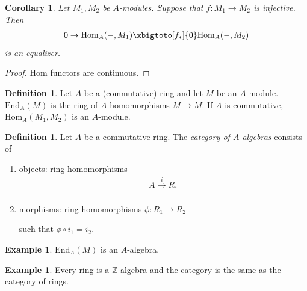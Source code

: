 \documentclass[12pt]{report}
\theoremstyle{plain}
\newtheorem{corollary}[theorem]{Corollary}
\theoremstyle{remark}
\theoremstyle{definition}
\newtheorem{definition}[theorem]{Definition}
\newtheorem{example}[theorem]{Example}
\newcommand{\Z}{\mathbb{Z}}
\newcommand{\Hom}[3]{\mathrm{Hom}_{#3}(#1,#2)}
\begin{document}
\begin{corollary}
    Let $M_1,M_2$ be $A$-modules. Suppose that $f:M_1\rightarrow M_2$ is injective. Then
    \begin{align*}
        0\to \Hom{-}{M_1}{A}\xbigtoto[f_*]{0} \Hom{-}{M_2}{A}
    \end{align*}
    is an equalizer.
\end{corollary}
\begin{proof}
    Hom functors are continuous.
\end{proof}

\begin{definition}
    Let $A$ be a (commutative) ring and let $M$ be an $A$-module. $\mathrm{End}_A(M)$ is the ring of $A$-homomorphisms $M\rightarrow M$. If $A$ is commutative, $\Hom{M_1}{M_2}{A}$ is an $A$-module.
\end{definition}

\begin{definition}
    Let $A$ be a commutative ring. The \emph{category of $A$-algebras} consists of
    \begin{enumerate}
        \item objects: ring homomorphisms
        \begin{align*}
            A\xrightarrow[]{i}R,
        \end{align*}
        \item morphisms: ring homomorphisms $\phi:R_1\rightarrow R_2$
        \begin{figure}[H]
            \centering
        \end{figure}
        \noindent such that $\phi\circ i_1=i_2$.
    \end{enumerate}
\end{definition}

\begin{example}
    $\mathrm{End}_A(M)$ is an $A$-algebra.
\end{example}

\begin{example}
    Every ring is a $\Z$-algebra and the category is the same as the category of rings.
\end{example}
\end{document}
